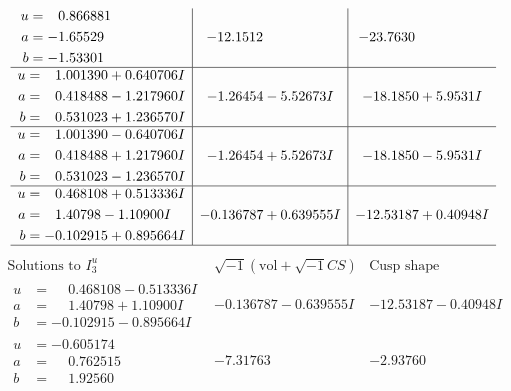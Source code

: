 \documentclass[1p]{elsarticle_modified}
\theoremstyle{definition}
\newcommand{\I}{\sqrt{-1}}
\begin{document}
$$\begin{array}{c|c|c}
\begin{aligned}
u &= \phantom{-}0.866881\phantom{ +0.000000I} \\
a &= -1.65529\phantom{ +0.000000I} \\
b &= -1.53301\phantom{ +0.000000I}\end{aligned}
 & -12.1512\phantom{ +0.000000I} & -23.7630\phantom{ +0.000000I} \\ \hline\begin{aligned}
u &= \phantom{-}1.001390 + 0.640706 I \\
a &= \phantom{-}0.418488 - 1.217960 I \\
b &= \phantom{-}0.531023 + 1.236570 I\end{aligned}
 & -1.26454 - 5.52673 I & -18.1850 + 5.9531 I \\ \hline\begin{aligned}
u &= \phantom{-}1.001390 - 0.640706 I \\
a &= \phantom{-}0.418488 + 1.217960 I \\
b &= \phantom{-}0.531023 - 1.236570 I\end{aligned}
 & -1.26454 + 5.52673 I & -18.1850 - 5.9531 I \\ \hline\begin{aligned}
u &= \phantom{-}0.468108 + 0.513336 I \\
a &= \phantom{-}1.40798 - 1.10900 I \\
b &= -0.102915 + 0.895664 I\end{aligned}
 & -0.136787 + 0.639555 I & -12.53187 + 0.40948 I\\
 \hline 
 \end{array}$$\newpage$$\begin{array}{c|c|c}  
\text{Solutions to }I^u_{3}& \I (\text{vol} + \sqrt{-1}CS) & \text{Cusp shape}\\
 \hline 
\begin{aligned}
u &= \phantom{-}0.468108 - 0.513336 I \\
a &= \phantom{-}1.40798 + 1.10900 I \\
b &= -0.102915 - 0.895664 I\end{aligned}
 & -0.136787 - 0.639555 I & -12.53187 - 0.40948 I \\ \hline\begin{aligned}
u &= -0.605174\phantom{ +0.000000I} \\
a &= \phantom{-}0.762515\phantom{ +0.000000I} \\
b &= \phantom{-}1.92560\phantom{ +0.000000I}\end{aligned}
 & -7.31763\phantom{ +0.000000I} & -2.93760\phantom{ +0.000000I} \\ \hline\begin{aligned}

\end{aligned}
\end{array}$$
\end{document}
